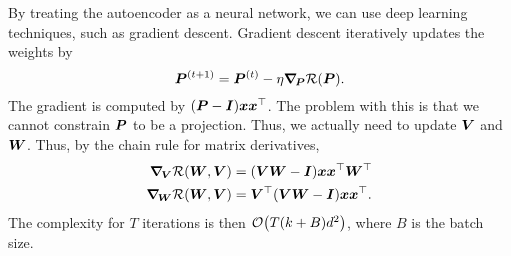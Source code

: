 By treating the autoencoder as a neural network, we can use deep learning techniques, such as
gradient descent. Gradient descent iteratively updates the weights by \[
    \mat{P}^{(t+1)} = \mat{P}^{(t)} - \eta \grad{\mathcal{R}(\mat{P})}{\mat{P}}.
\]
The gradient is computed by $(\mat{P} - \mat{I})\vec{x}\transpose{\vec{x}}$. The problem with this
is that we cannot constrain $\mat{P}$ to be a projection. Thus, we actually need to update
$\mat{V}$ and $\mat{W}$. Thus, by the chain rule for matrix derivatives,
\begin{align*}
    \grad{\mathcal{R}(\mat{W}, \mat{V})}{\mat{V}} & = (\mat{V} \mat{W}  - \mat{I}) \vec{x} \transpose{\vec{x}} \transpose{\mat{W}} \\
    \grad{\mathcal{R}(\mat{W}, \mat{V})}{\mat{W}} & = \transpose{\mat{V}} (\mat{V} \mat{W} - \mat{I}) \vec{x} \transpose{\vec{x}}.
\end{align*}
The complexity for $T$ iterations is then $\bigo{T(k+B)d^2}$, where $B$ is the batch size.

